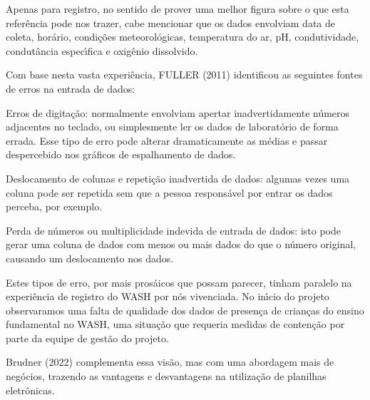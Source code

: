 \documentclass[
12pt,		%
openright,	%
twoside,  %
a4paper,			%
chapter=TITLE,		%
english,			%
french,				%
spanish,			%
brazil				%
]{USPSC-classe/USPSC}
\begin{document}
Apenas para registro, no sentido de prover uma melhor figura sobre o que esta refer\^encia pode nos trazer, cabe mencionar que os dados envolviam data de coleta, hor\'ario, condi\c{c}\~oes meteorol\'ogicas, temperatura do ar, pH, condutividade, condut\^ancia espec\'{\i}fica e oxig\^enio dissolvido.










Com base nesta vasta experi\^encia,  FULLER (2011) identificou as seguintes fontes de erros na entrada de dados:











\begin{alineas}
\item Erros de digita\c{c}\~ao: normalmente envolviam apertar inadvertidamente n\'umeros adjacentes no teclado, ou simplesmente ler os dados de laborat\'orio de forma errada. Esse tipo de erro pode alterar dramaticamente as m\'edias e passar despercebido nos gr\'aficos de espalhamento de dados.
\item Deslocamento de colunas e repeti\c{c}\~ao inadvertida de dados: algumas vezes uma coluna pode ser repetida sem que a pessoa respons\'avel por entrar os dados perceba, por exemplo.
\item Perda de n\'umeros ou multiplicidade indevida de entrada de dados: isto pode gerar uma coluna de dados com menos ou mais dados do que o n\'umero original, causando um deslocamento nos dados.
\end{alineas}

Estes tipos de erro, por mais pros\'aicos que possam parecer, tinham paralelo na experi\^encia de registro do WASH por n\'os vivenciada. No in\'{\i}cio do projeto observaramos uma falta de qualidade dos dados de presen\c{c}a de crian\c{c}as do ensino fundamental no WASH, uma situa\c{c}\~ao que requeria medidas de conten\c{c}\~ao por parte da equipe de gest\~ao do projeto.










 Brudner (2022) complementa essa vis\~ao, mas com uma abordagem mais de neg\'ocios, trazendo as vantagens e desvantagens na utiliza\c{c}\~ao de planilhas eletr\^onicas.
\end{document}
